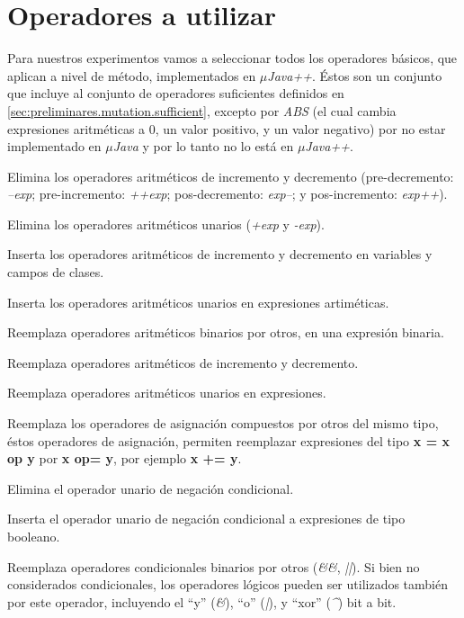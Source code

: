 \section{Operadores a utilizar}
\label{sec:evaluation.operators}

Para nuestros experimentos vamos a seleccionar todos los operadores b\'asicos, que aplican a nivel de m\'etodo, implementados en \emph{$\mu$Java++}. \'Estos son un conjunto que incluye al conjunto de operadores suficientes definidos en \ref{sec:preliminares.mutation.sufficient}, excepto por \emph{ABS} (el cual cambia expresiones aritm\'eticas a 0, un valor positivo, y un valor negativo) por no estar implementado en \emph{$\mu$Java} y por lo tanto no lo est\'a en \emph{$\mu$Java++}.

\begin{description}[leftmargin=8em,style=nextline]
	\item[AODS] Elimina los operadores aritm\'eticos de incremento y decremento (pre-decremento: \emph{--exp}; pre-incremento: \emph{++exp}; pos-decremento: \emph{exp--}; y pos-incremento: \emph{exp++}).
	\item[AODU] Elimina los operadores aritm\'eticos unarios (\emph{+exp} y \emph{-exp}).
	\item[AOIS] Inserta los operadores aritm\'eticos de incremento y decremento en variables y campos de clases.
	\item[AOIU] Inserta los operadores aritm\'eticos unarios en expresiones artim\'eticas.
	\item[AORB] Reemplaza operadores aritm\'eticos binarios por otros, en una expresi\'on binaria.
	\item[AORS] Reemplaza operadores aritm\'eticos de incremento y decremento.
	\item[AORU] Reemplaza operadores aritm\'eticos unarios en expresiones.
	\item[ASRS] Reemplaza los operadores de asignaci\'on compuestos por otros del mismo tipo, \'estos operadores de asignaci\'on, permiten reemplazar expresiones del tipo \textbf{x = x op y} por \textbf{x op= y}, por ejemplo \textbf{x += y}.
	\item[COD] Elimina el operador unario de negaci\'on condicional.
	\item[COI] Inserta el operador unario de negaci\'on condicional a expresiones de tipo booleano.
	\item[COR] Reemplaza operadores condicionales binarios por otros (\emph{\&\&}, \emph{||}). Si bien no considerados condicionales, los operadores l\'ogicos pueden ser utilizados tambi\'en por este operador, incluyendo el ``y'' (\emph{\&}), ``o'' (\emph{|}), y ``xor'' (\emph{\^}) bit a bit.

\end{description}

